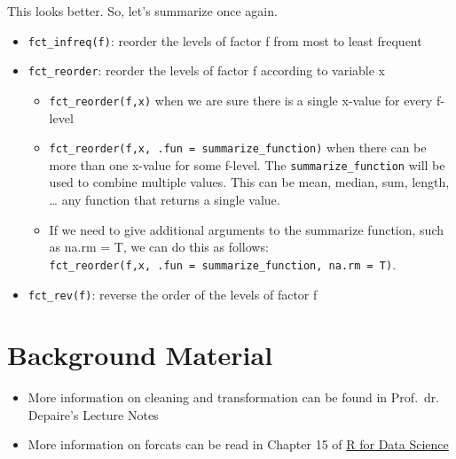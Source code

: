 \documentclass[]{tufte-book}
\providecommand{\tightlist}{%
  \setlength{\itemsep}{0pt}\setlength{\parskip}{0pt}}
\begin{document}
This looks better. So, let's summarize once again.

\begin{itemize}
\tightlist
\item
  \texttt{fct\_infreq(f)}: reorder the levels of factor f from most to
  least frequent
\item
  \texttt{fct\_reorder}: reorder the levels of factor f according to
  variable x

  \begin{itemize}
  \tightlist
  \item
    \texttt{fct\_reorder(f,x)} when we are sure there is a single
    x-value for every f-level
  \item
    \texttt{fct\_reorder(f,x,\ .fun\ =\ summarize\_function)} when there
    can be more than one x-value for some f-level. The
    \texttt{summarize\_function} will be used to combine multiple
    values. This can be mean, median, sum, length, \ldots{} any function
    that returns a single value.
  \item
    If we need to give additional arguments to the summarize function,
    such as na.rm = T, we can do this as follows:
    \texttt{fct\_reorder(f,x,\ .fun\ =\ summarize\_function,\ na.rm\ =\ T)}.
  \end{itemize}
\item
  \texttt{fct\_rev(f)}: reverse the order of the levels of factor f
\end{itemize}

\chapter*{Background Material}\label{background-material-1}

\begin{itemize}
\tightlist
\item
  More information on cleaning and transformation can be found in
  Prof.~dr. Depaire's Lecture Notes
\item
  More information on forcats can be read in Chapter 15 of
  \href{https://r4ds.had.co.nz/factors.html}{R for Data Science}
\end{itemize}
\end{document}
